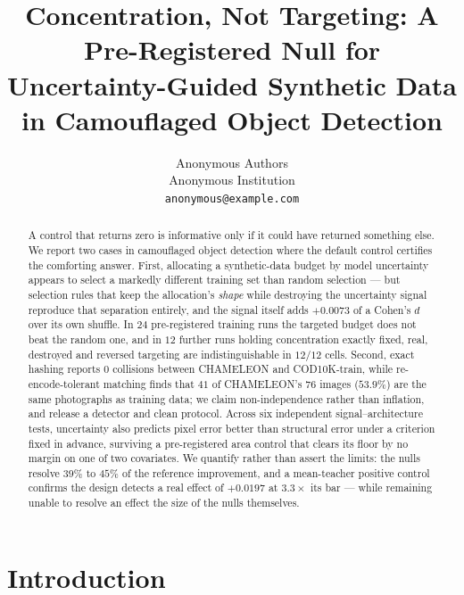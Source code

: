 \documentclass{article} %
\title{Concentration, Not Targeting: A Pre-Registered Null for\\
Uncertainty-Guided Synthetic Data in Camouflaged Object Detection}
\author{Anonymous Authors \\
Anonymous Institution \\
\texttt{anonymous@example.com}
}
\begin{document}
\maketitle

\begin{abstract}
A control that returns zero is informative only if it could have returned something else. We report
two cases in camouflaged object detection where the default control certifies the comforting answer.
First, allocating a synthetic-data budget by model uncertainty appears to select a markedly different
training set than random selection --- but selection rules that keep the allocation's \emph{shape}
while destroying the uncertainty signal reproduce that separation entirely, and the signal itself adds
$+0.0073$ of a Cohen's $d$ over its own shuffle. In $24$ pre-registered training runs the targeted
budget does not beat the random one, and in $12$ further runs holding concentration exactly fixed,
real, destroyed and reversed targeting are indistinguishable in $12/12$ cells. Second, exact hashing
reports $0$ collisions between CHAMELEON and COD10K-train, while re-encode-tolerant matching finds
that $41$ of CHAMELEON's $76$ images ($53.9\%$) are the same photographs as training data; we claim
non-independence rather than inflation, and release a detector and clean protocol. Across six
independent signal--architecture tests, uncertainty also predicts pixel error better than structural
error under a criterion fixed in advance, surviving a pre-registered area control that clears its
floor by no margin on one of two covariates. We quantify rather than assert the limits: the nulls
resolve $39\%$ to $45\%$ of the reference improvement, and a mean-teacher positive control confirms
the design detects a real effect of $+0.0197$ at $3.3\times$ its bar --- while remaining unable to
resolve an effect the size of the nulls themselves.
\end{abstract}

\section{Introduction}
\label{sec:intro}
\end{document}
